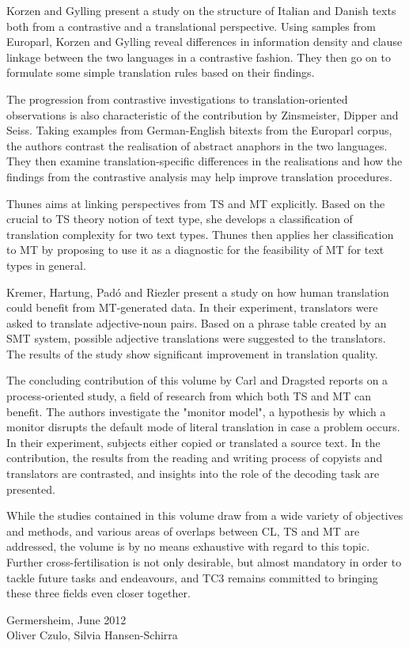 \documentclass[output=paper]{LSP/langsci}
\begin{document}
Korzen and Gylling present a study on the structure of Italian and Danish texts both from a contrastive and a translational perspective. Using samples from Europarl, Korzen and Gylling reveal differences in information density and clause linkage between the two languages in a contrastive fashion. They then go on to formulate some simple translation rules based on their findings.

The progression from contrastive investigations to translation-oriented observations is also characteristic of the contribution by Zinsmeister, Dipper and Seiss. Taking examples from German-English bitexts from the Europarl corpus, the authors contrast the realisation of abstract anaphors in the two languages. They then examine translation-specific differences in the realisations and how the findings from the contrastive analysis may help improve translation procedures.

Thunes aims at linking perspectives from TS and MT explicitly. Based on the crucial to TS theory notion of text type, she develops a classification of translation complexity for two text types. Thunes then applies her classification to MT by proposing to use it as a diagnostic for the feasibility of MT for text types in general.

Kremer, Hartung, Padó and Riezler present a study on how human translation could benefit from MT-generated data. In their experiment, translators were asked to translate adjective-noun pairs. Based on a phrase table created by an SMT system, possible adjective translations were suggested to the translators. The results of the study show significant improvement in translation quality.

The concluding contribution of this volume by Carl and Dragsted reports on a process-oriented study, a field of research from which both TS and MT can benefit. The authors investigate the "monitor model", a hypothesis by which a monitor disrupts the default mode of literal translation in case a problem occurs. In their experiment, subjects either copied or translated a source text. In the contribution, the results from the reading and writing process of copyists and translators are contrasted, and insights into the role of the decoding task are presented.

While the studies contained in this volume draw from a wide variety of objectives and methods, and various areas of overlaps between CL, TS and MT are addressed, the volume is by no means exhaustive with regard to this topic. Further cross-fertilisation is not only desirable, but almost mandatory in order to tackle future tasks and endeavours, and TC3 remains committed to bringing these three fields even closer together.


\bigskip
\hfill Germersheim, June 2012\\
\bigskip
\hfill Oliver Czulo, Silvia Hansen-Schirra
\end{document}
